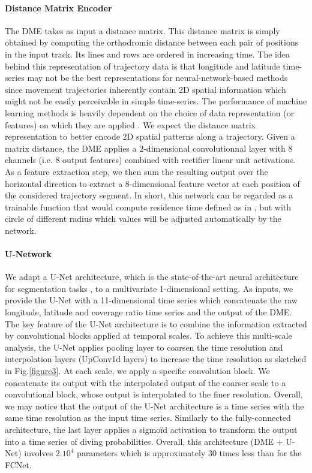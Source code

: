 \documentclass{article}
\begin{document}
\paragraph{Distance Matrix Encoder}
The DME takes as input a distance matrix.
This distance matrix is simply obtained by computing the orthodromic distance between each pair of positions in the input track. Its lines and rows are ordered in increasing time.
The idea behind this representation of trajectory data is that longitude and latitude time-series may not be the best representations for neural-network-based methods since movement trajectories inherently contain 2D spatial information which might not be easily perceivable in simple time-series.
The performance of machine learning methods is heavily dependent on the choice of data representation (or features) on which they are applied \citep{bengio_representation_2014}. We expect the distance matrix representation to better encode 2D spatial patterns along a trajectory.
Given a matrix distance, the DME applies a 2-dimensional convolutionnal layer with 8 channels (i.e. 8 output features) combined with rectifier linear unit activations.
As a feature extraction step, we then sum the resulting output over the horizontal direction to extract a 8-dimensional feature vector at each position of the considered trajectory segment.
In short, this network can be regarded as a trainable function that would compute residence time defined as in \citep{barraquand_animal_2008}, but with circle of different radius which values will be adjusted automatically by the network.

\paragraph{U-Network}
We adapt a U-Net architecture, which is the state-of-the-art neural architecture for segmentation tasks \citep{ronneberger_u-net_2015}, to a multivariate 1-dimensional setting.
As inputs, we provide the U-Net with a 11-dimensional time series which concatenate the raw longitude, latitude and coverage ratio time series and the output of the DME. The key feature of the U-Net architecture is to combine the information extracted by convolutional blocks applied at temporal scales. To achieve this multi-scale analysis, the U-Net applies pooling layer to coarsen the time resolution and interpolation layers (UpConv1d layers) to increase the time resolution as sketched in Fig.\ref{figure3}. At each scale, we apply a specific convolution block. We concatenate its output with the interpolated output of the coarser scale to a convolutional block, whose output is interpolated to the finer resolution. Overall, we may notice that the output of the U-Net architecture is a time series with the same time resolution as the input time series. Similarly to the fully-connected architecture, the last layer applies a sigmoïd activation to transform the output into a time series of diving probabilities. Overall, this architecture (DME + U-Net) involves $2.10^{4}$ parameters which is approximately 30 times less than for the FCNet.
\end{document}
